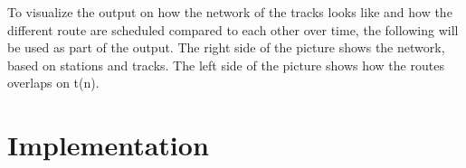 \documentclass[10pt,a4paper]{article}
\begin{document}
To visualize the output on how the network of the tracks looks like and how the different route are scheduled compared to each other over time, the following will be used as part of the output. 
The right side of the picture shows the network, based on stations and tracks. The left side of the picture shows how the routes overlaps on t(n).


\section{Implementation}


\appendix



\nocite{Dijkstra:1979:PCH:1241515.1241516}
\nocite{Chapman:2006:CCM:1151816.1151820}
\nocite{bishop2004teaching}
\nocite{Wikipedia:Defensive_programming}
\nocite{Wikipedia:OO_encapsulation}
\end{document}
